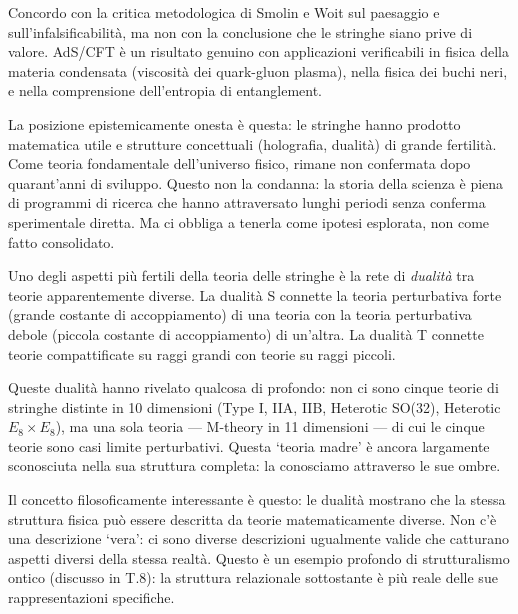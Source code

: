 \documentclass[12pt,a4paper,openany]{book}
\newcommand{\sezione}[1]{\vspace{1.2em}{\large\bfseries #1}\vspace{0.5em}\par}
\begin{document}
\sezione{La mia posizione epistemologica}

Concordo con la critica metodologica di Smolin e Woit sul paesaggio e sull'infalsificabilità, ma non con la conclusione che le stringhe siano prive di valore. AdS/CFT è un risultato genuino con applicazioni verificabili in fisica della materia condensata (viscosità dei quark-gluon plasma), nella fisica dei buchi neri, e nella comprensione dell'entropia di entanglement.

La posizione epistemicamente onesta è questa: le stringhe hanno prodotto matematica utile e strutture concettuali (holografia, dualità) di grande fertilità. Come teoria fondamentale dell'universo fisico, rimane non confermata dopo quarant'anni di sviluppo. Questo non la condanna: la storia della scienza è piena di programmi di ricerca che hanno attraversato lunghi periodi senza conferma sperimentale diretta. Ma ci obbliga a tenerla come ipotesi esplorata, non come fatto consolidato.

\sezione{La dualità S e le dualità di rete: quando le teorie si specchiano}

Uno degli aspetti più fertili della teoria delle stringhe è la rete di \textit{dualità} tra teorie apparentemente diverse. La dualità S connette la teoria perturbativa forte (grande costante di accoppiamento) di una teoria con la teoria perturbativa debole (piccola costante di accoppiamento) di un'altra. La dualità T connette teorie compattificate su raggi grandi con teorie su raggi piccoli.

Queste dualità hanno rivelato qualcosa di profondo: non ci sono cinque teorie di stringhe distinte in 10 dimensioni (Type I, IIA, IIB, Heterotic SO(32), Heterotic $E_8 \times E_8$), ma una sola teoria --- M-theory in 11 dimensioni --- di cui le cinque teorie sono casi limite perturbativi. Questa `teoria madre' è ancora largamente sconosciuta nella sua struttura completa: la conosciamo attraverso le sue ombre.

Il concetto filosoficamente interessante è questo: le dualità mostrano che la stessa struttura fisica può essere descritta da teorie matematicamente diverse. Non c'è una descrizione `vera': ci sono diverse descrizioni ugualmente valide che catturano aspetti diversi della stessa realtà. Questo è un esempio profondo di strutturalismo ontico (discusso in T.8): la struttura relazionale sottostante è più reale delle sue rappresentazioni specifiche.

\sezione{La crisi della naturalness e le sue implicazioni}
\end{document}
